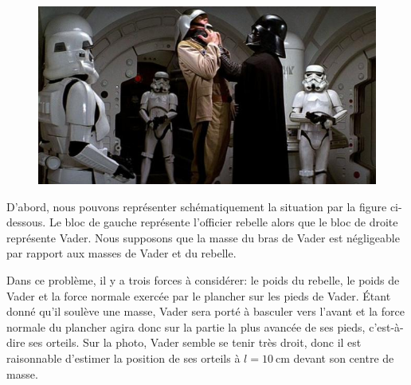 \documentclass{tufte-handout}
\begin{document}
\begin{figure}
\begin{center}
  \includegraphics[scale=1]{vader_consular_ship.jpg}
\end{center}
\end{figure}

D'abord, nous pouvons représenter schématiquement la situation par la figure
ci-dessous.  Le bloc de gauche représente l'officier rebelle alors que le bloc
de droite représente Vader.  Nous supposons que la masse du bras de Vader est
négligeable par rapport aux masses de Vader et du rebelle.

Dans ce problème, il y a trois forces à considérer: le poids du rebelle, le
poids de Vader et la force normale exercée par le plancher sur les pieds de
Vader.  Étant donné qu'il soulève une masse, Vader sera porté à basculer vers
l'avant et la force normale du plancher agira donc sur la partie la plus
avancée de ses pieds, c'est-à-dire ses orteils.  Sur la photo, Vader semble se
tenir très droit, donc il est raisonnable d'estimer la position de ses
orteils à $l = \SI{10}{\centi\meter}$ devant son centre de masse.

\begin{marginfigure}
  \begin{center}
  \end{center}
\end{marginfigure}
\end{document}
